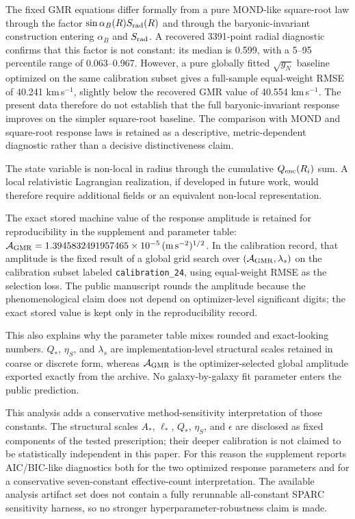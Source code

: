﻿\documentclass[twocolumn]{aastex701}
\begin{document}
The fixed GMR equations differ formally from a pure MOND-like square-root law through the factor $\sin\alpha_B(R)S_{\rm rad}(R)$ and through the baryonic-invariant construction entering $\alpha_B$ and $S_{\rm rad}$. A recovered 3391-point radial diagnostic confirms that this factor is not constant: its median is 0.599, with a 5--95 percentile range of 0.063--0.967. However, a pure globally fitted $\sqrt{g_N}$ baseline optimized on the same calibration subset gives a full-sample equal-weight RMSE of 40.241 km\,s$^{-1}$, slightly below the recovered GMR value of 40.554 km\,s$^{-1}$. The present data therefore do not establish that the full baryonic-invariant response improves on the simpler square-root baseline. The comparison with MOND and square-root response laws is retained as a descriptive, metric-dependent diagnostic rather than a decisive distinctiveness claim.

The state variable is non-local in radius through the cumulative $Q_{\rm enc}(R_i)$ sum. A local relativistic Lagrangian realization, if developed in future work, would therefore require additional fields or an equivalent non-local representation.


The exact stored machine value of the response amplitude is retained for reproducibility in the supplement and parameter table: $\mathcal{A}_{\rm GMR} = 1.3945832491957465\times10^{-5}\,(\mathrm{m\,s^{-2}})^{1/2}$. In the calibration record, that amplitude is the fixed result of a global grid search over $(\mathcal{A}_{\rm GMR}, \lambda_s)$ on the calibration subset labeled \texttt{calibration\_24}, using equal-weight RMSE as the selection loss. The public manuscript rounds the amplitude because the phenomenological claim does not depend on optimizer-level significant digits; the exact stored value is kept only in the reproducibility record.

This also explains why the parameter table mixes rounded and exact-looking numbers. $Q_*$, $\eta_S$, and $\lambda_s$ are implementation-level structural scales retained in coarse or discrete form, whereas $\mathcal{A}_{\rm GMR}$ is the optimizer-selected global amplitude exported exactly from the archive. No galaxy-by-galaxy fit parameter enters the public prediction.

This analysis adds a conservative method-sensitivity interpretation of those constants. The structural scales $A_*$, $\ell_*$, $Q_*$, $\eta_S$, and $\epsilon$ are disclosed as fixed components of the tested prescription; their deeper calibration is not claimed to be statistically independent in this paper. For this reason the supplement reports AIC/BIC-like diagnostics both for the two optimized response parameters and for a conservative seven-constant effective-count interpretation. The available analysis artifact set does not contain a fully rerunnable all-constant SPARC sensitivity harness, so no stronger hyperparameter-robustness claim is made.
\end{document}
